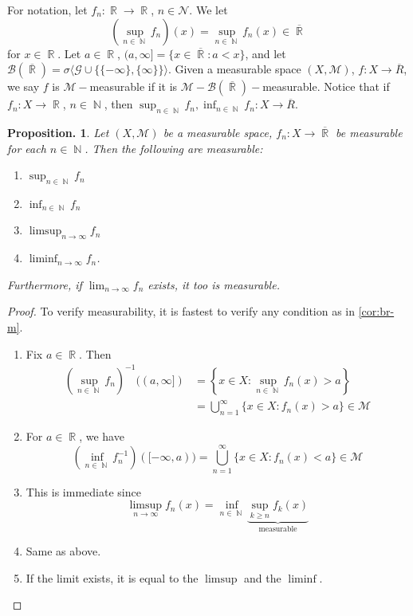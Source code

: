 \documentclass[11pt, a4paper]{memoir}
\DeclareMathOperator{\N}{{\mathbb{N}}}
\DeclareMathOperator{\R}{{\mathbb{R}}}
\newcommand{\ol}[1]{\ensuremath{\overline{#1}}}
\theoremstyle{change}
\newtheorem{proposition}[theorem]{Proposition.}
\theoremstyle{plain}
\theoremstyle{nonumberplain}
\newtheorem{proof}{Proof}
\numberwithin{equation}{section}
\begin{document}
For notation, let $f_n:\R\to\R$, $n\in\mathcal{N}$.
We let
\begin{equation}
    (\sup_{n\in\N} f_n)(x)=\sup_{n\in\N} f_n(x)\in\ol{\R}
\end{equation}
for $x\in \R$.
Let $a\in\R$, $(a,\infty]=\{x\in\ol{\R}:a<x\}$, and let $\mathcal{B}(\ol{\R})=\sigma\langle\mathcal{G}\cup\{\{-\infty\},\{\infty\}\}\rangle$.
Given a measurable space $(X,\mathcal{M})$, $f:X\to\ol{R}$, we say $f$ is $\mathcal{M}-$measurable if it is $\mathcal{M}-\mathcal{B}(\ol{\R})-$measurable.
Notice that if $f_n:X\to\R$, $n\in\N$, then $\sup_{n\in\N}f_n,\inf_{n\in\N}f_n:X\to\ol{R}$.
\begin{proposition}
    Let $(X,\mathcal{M})$ be a measurable space, $f_n:X\to\ol{\R}$ be measurable for each $n\in\N$.
    Then the following are measurable:
    \begin{enumerate}[nl,r]
        \item $\sup_{n\in\N}f_n$
        \item $\inf_{n\in\N}f_n$
        \item $\limsup_{n\to\infty}f_n$
        \item $\liminf_{n\to\infty}f_n$.
    \end{enumerate}
    Furthermore, if $\lim_{n\to\infty}f_n$ exists, it too is measurable.
\end{proposition}
\begin{proof}
    To verify measurability, it is fastest to verify any condition as in \cref{cor:br-m}.
    \begin{enumerate}[r]
        \item Fix $a\in\R$.
            Then
            \begin{align*}
                \left(\sup_{n\in\N}f_n\right)^{-1}((a,\infty]) &= \left\{x\in X:\sup_{n\in\N}f_n(x)>a\right\}\\ %
                                                               &=\bigcup_{n=1}^\infty\bigl\{x\in X:f_n(x)>a\bigr\}\in\mathcal{M}
            \end{align*}
        \item For $a\in\R$, we have
            \begin{equation*}
                \left(\inf_{n\in\N}f_n^{-1}\right)([-\infty,a))=\bigcup_{n=1}^\infty\bigl\{x\in X:f_n(x)<a\bigr\}\in\mathcal{M} %
            \end{equation*}
        \item This is immediate since
            \begin{equation*}
                \limsup_{n\to\infty}f_n(x)=\inf_{n\in\N}\underbrace{\sup_{k\geq n}f_k(x)}_{\text{measurable}}
            \end{equation*}
        \item Same as above.
        \item If the limit exists, it is equal to the $\limsup$ and the $\liminf$.
    \end{enumerate}
\end{proof}
\end{document}
